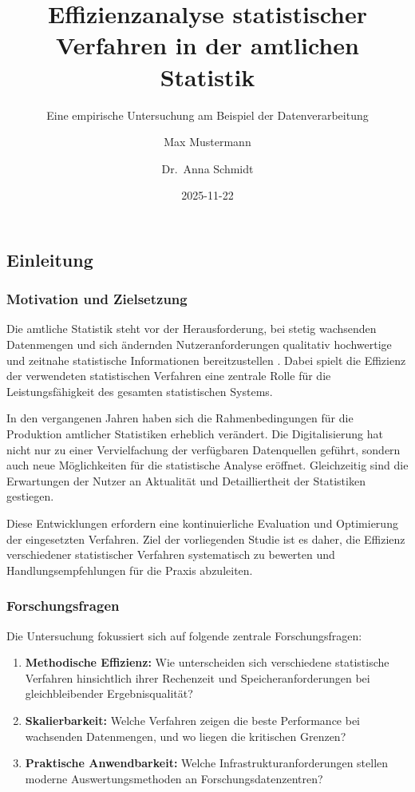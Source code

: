\documentclass[
  ngerman,
  10pt,
  twocolumn]{article}
\title{Effizienzanalyse statistischer Verfahren in der amtlichen
Statistik}
\subtitle{Eine empirische Untersuchung am Beispiel der
Datenverarbeitung}
\author{Max Mustermann \and Dr.~Anna Schmidt}
\date{2025-11-22}
\begin{document}
\maketitle


\subsection{Einleitung}\label{sec-einleitung}

\subsubsection{Motivation und
Zielsetzung}\label{motivation-und-zielsetzung}

Die amtliche Statistik steht vor der Herausforderung, bei stetig
wachsenden Datenmengen und sich ändernden Nutzeranforderungen qualitativ
hochwertige und zeitnahe statistische Informationen bereitzustellen
\autocite{destatis2023}. Dabei spielt die Effizienz der verwendeten
statistischen Verfahren eine zentrale Rolle für die Leistungsfähigkeit
des gesamten statistischen Systems.

In den vergangenen Jahren haben sich die Rahmenbedingungen für die
Produktion amtlicher Statistiken erheblich verändert. Die
Digitalisierung hat nicht nur zu einer Vervielfachung der verfügbaren
Datenquellen geführt, sondern auch neue Möglichkeiten für die
statistische Analyse eröffnet. Gleichzeitig sind die Erwartungen der
Nutzer an Aktualität und Detailliertheit der Statistiken gestiegen.

Diese Entwicklungen erfordern eine kontinuierliche Evaluation und
Optimierung der eingesetzten Verfahren. Ziel der vorliegenden Studie ist
es daher, die Effizienz verschiedener statistischer Verfahren
systematisch zu bewerten und Handlungsempfehlungen für die Praxis
abzuleiten.

\subsubsection{Forschungsfragen}\label{forschungsfragen}

Die Untersuchung fokussiert sich auf folgende zentrale Forschungsfragen:

\begin{enumerate}
\def\labelenumi{\arabic{enumi}.}
\item
  \textbf{Methodische Effizienz:} Wie unterscheiden sich verschiedene
  statistische Verfahren hinsichtlich ihrer Rechenzeit und
  Speicheranforderungen bei gleichbleibender Ergebnisqualität?
\item
  \textbf{Skalierbarkeit:} Welche Verfahren zeigen die beste Performance
  bei wachsenden Datenmengen, und wo liegen die kritischen Grenzen?
\item
  \textbf{Praktische Anwendbarkeit:} Welche Infrastrukturanforderungen
  stellen moderne Auswertungsmethoden an Forschungsdatenzentren?
\end{enumerate}
\end{document}
